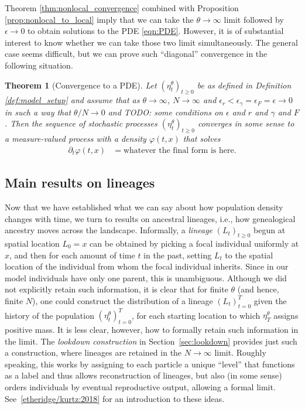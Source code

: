 \documentclass[12pt]{article}
\newtheorem{theorem}{Theorem}[section]
\newcommand{\comment}[1]{{\color{blue} \it #1}}
\begin{document}
Theorem \ref{thm:nonlocal_convergence} combined with Proposition \ref{prop:nonlocal_to_local}
imply that we can take the $\theta \to \infty$ limit
followed by $\epsilon \to 0$
to obtain solutions to the PDE \eqref{eqn:PDE}.
However, it is of substantial interest to know whether
we can take those two limit simultaneously.
The general case seems difficult,
but we can prove such ``diagonal'' convergence in the following situation.

\begin{theorem}[Convergence to a PDE]
    \label{thm:local_convergence}
    Let $(\eta^\theta_t)_{t \geq 0}$
    be as defined in Definition \ref{def:model_setup}
    and assume that as $\theta \to \infty$, $N \to \infty$
    and $\epsilon_r < \epsilon_\gamma = \epsilon_F = \epsilon \to 0$
    in such a way that $\theta/N \to 0$
    and
    \comment{TODO: some conditions on $\epsilon$ and $r$ and $\gamma$ and $F$}.
    Then the sequence of stochastic processes $(\eta^\theta_t)_{t \ge 0}$
    converges \comment{in some sense}
    to a measure-valued process with a density $\varphi(t, x)$
    that solves
    \begin{align}
        \partial_t \varphi(t, x)
        &=
        \text{whatever the final form is here} .
    \end{align}
\end{theorem}


\subsection{Main results on lineages}

Now that we have established what we can say about how population density changes with time,
we turn to results on ancestral lineages,
i.e., how genealogical ancestry moves across the landscape.
Informally,
a \emph{lineage} $(L_t)_{t \ge 0}$
begun at spatial location $L_0 = x$
can be obtained by picking a focal individual uniformly at $x$,
and then for each amount of time $t$ in the past,
setting $L_t$ to the spatial location of the individual from whom
the focal individual inherits.
Since in our model individuals have only one parent, this is unambiguous.
Although we did not explicitly retain such information,
it is clear that
for finite $\theta$ (and hence, finite $N$),
one could construct the distribution of a lineage $(L_t)_{t=0}^T$
given the history of the population $(\eta^\theta_t)_{t = 0}^T$,
for each starting location to which $\eta^\theta_T$ assigns positive mass.
It is less clear, however, how to formally retain such information in the limit.
The \emph{lookdown construction} in Section~\ref{sec:lookdown}
provides just such a construction,
where lineages are retained in the $N \to \infty$ limit.
Roughly speaking,
this works by assigning to each particle a unique ``level''
that functions as a label and thus allows reconstruction of lineages,
but also (in some sense) orders individuals by eventual reproductive output,
allowing a formal limit.
See~\ref{etheridge/kurtz:2018} for an introduction to these ideas.
\end{document}
